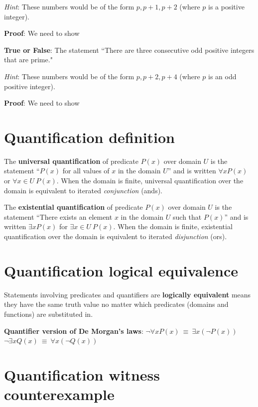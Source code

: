 \documentclass[12pt, oneside]{article}
\begin{document}
{\it Hint}: These numbers would be of the form $p, p+1, p+2$ (where $p$ is a positive integer).

{\bf Proof}: We need to show \underline{}

\vspace{200pt}

{\bf True or False}: The statement ``There are three consecutive odd positive integers that are prime."

{\it Hint}: These numbers would be of the form $p, p+2, p+4$ (where $p$ is an odd positive integer).

{\bf Proof}: We need to show \underline{}

\vspace{200pt}
 \vfill
\section*{Quantification definition}


The {\bf universal quantification} of predicate $P(x)$ over
domain $U$ is the statement ``$P(x)$ for all values of $x$ in the domain $U$''
and is written $\forall x P(x)$ or $\forall x \in U ~P(x)$. 
When the domain is finite, universal quantification over the domain 
is equivalent to iterated {\it conjunction} (ands).

The {\bf existential quantification} of predicate $P(x)$ 
over domain $U$ is the statement ``There exists an element $x$ 
in the domain $U$ such that $P(x)$'' and is written $\exists x P(x)$
for $\exists x \in U ~P(x)$. 
When the domain is finite, existential quantification over the domain 
is equivalent to iterated {\it disjunction} (ors).
 \vfill
\section*{Quantification logical equivalence}


Statements involving predicates and quantifiers are {\bf logically equivalent} 
means they have the same truth value no matter which predicates (domains and functions) 
are substituted in. 

{\bf Quantifier version of De Morgan's laws}: 
$\boxed{\neg \forall x P(x) ~\equiv~ \exists x \left( \neg P(x) \right)}$
\qquad
\qquad
$\boxed{\neg \exists x Q(x) ~\equiv~ \forall x \left( \neg Q(x) \right)}$
 \vfill
\section*{Quantification witness counterexample}
\end{document}
